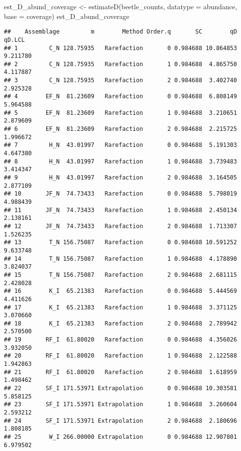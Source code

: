 \documentclass[
]{article}
\newenvironment{Shaded}{\begin{snugshade}}{\end{snugshade}}
\newcommand{\AttributeTok}[1]{\textcolor[rgb]{0.77,0.63,0.00}{#1}}
\newcommand{\FunctionTok}[1]{\textcolor[rgb]{0.00,0.00,0.00}{#1}}
\newcommand{\NormalTok}[1]{#1}
\newcommand{\OtherTok}[1]{\textcolor[rgb]{0.56,0.35,0.01}{#1}}
\newcommand{\StringTok}[1]{\textcolor[rgb]{0.31,0.60,0.02}{#1}}
\begin{document}
\begin{Shaded}
\begin{Highlighting}[]
\NormalTok{est\_D\_abund\_coverage }\OtherTok{\textless{}{-}} \FunctionTok{estimateD}\NormalTok{(beetle\_counts, }\AttributeTok{datatype =} \StringTok{\textquotesingle{}abundance\textquotesingle{}}\NormalTok{, }\AttributeTok{base =} \StringTok{\textquotesingle{}coverage\textquotesingle{}}\NormalTok{)}
\NormalTok{est\_D\_abund\_coverage}
\end{Highlighting}
\end{Shaded}

\begin{verbatim}
##    Assemblage         m        Method Order.q       SC        qD   qD.LCL
## 1         C_N 128.75935   Rarefaction       0 0.984688 10.864853 9.211780
## 2         C_N 128.75935   Rarefaction       1 0.984688  4.865750 4.117887
## 3         C_N 128.75935   Rarefaction       2 0.984688  3.402740 2.925328
## 4        EF_N  81.23609   Rarefaction       0 0.984688  6.808149 5.964588
## 5        EF_N  81.23609   Rarefaction       1 0.984688  3.210651 2.879609
## 6        EF_N  81.23609   Rarefaction       2 0.984688  2.215725 1.996672
## 7         H_N  43.01997   Rarefaction       0 0.984688  5.191303 4.647380
## 8         H_N  43.01997   Rarefaction       1 0.984688  3.739483 3.414347
## 9         H_N  43.01997   Rarefaction       2 0.984688  3.164505 2.877109
## 10       JF_N  74.73433   Rarefaction       0 0.984688  5.798019 4.988439
## 11       JF_N  74.73433   Rarefaction       1 0.984688  2.450134 2.138161
## 12       JF_N  74.73433   Rarefaction       2 0.984688  1.713307 1.526235
## 13        T_N 156.75087   Rarefaction       0 0.984688 10.591252 9.633748
## 14        T_N 156.75087   Rarefaction       1 0.984688  4.178890 3.824037
## 15        T_N 156.75087   Rarefaction       2 0.984688  2.681115 2.428028
## 16        K_I  65.21383   Rarefaction       0 0.984688  5.444569 4.411626
## 17        K_I  65.21383   Rarefaction       1 0.984688  3.371125 3.070660
## 18        K_I  65.21383   Rarefaction       2 0.984688  2.789942 2.570500
## 19       RF_I  61.80020   Rarefaction       0 0.984688  4.356026 3.932050
## 20       RF_I  61.80020   Rarefaction       1 0.984688  2.122588 1.942863
## 21       RF_I  61.80020   Rarefaction       2 0.984688  1.618959 1.498462
## 22       SF_I 171.53971 Extrapolation       0 0.984688 10.303581 5.858125
## 23       SF_I 171.53971 Extrapolation       1 0.984688  3.260604 2.593212
## 24       SF_I 171.53971 Extrapolation       2 0.984688  2.180696 1.808185
## 25        W_I 266.00000 Extrapolation       0 0.984688 12.907801 6.979502

\end{verbatim}
\end{document}
